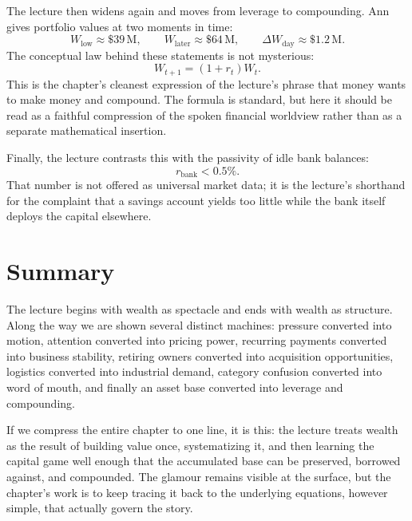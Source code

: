 The lecture then widens again and moves from leverage to compounding. Ann gives portfolio values at two moments in time:
\begin{equation}
W_{\mathrm{low}} \approx \$39\,\mathrm{M},
\qquad
W_{\mathrm{later}} \approx \$64\,\mathrm{M},
\qquad
\Delta W_{\mathrm{day}} \approx \$1.2\,\mathrm{M}.
\end{equation}
The conceptual law behind these statements is not mysterious:
\begin{equation}
W_{t+1} = (1+r_t)W_t.
\end{equation}
This is the chapter's cleanest expression of the lecture's phrase that money wants to make money and compound. The formula is standard, but here it should be read as a faithful compression of the spoken financial worldview rather than as a separate mathematical insertion.

Finally, the lecture contrasts this with the passivity of idle bank balances:
\begin{equation}
r_{\mathrm{bank}} < 0.5\%.
\end{equation}
That number is not offered as universal market data; it is the lecture's shorthand for the complaint that a savings account yields too little while the bank itself deploys the capital elsewhere.

\section{Summary}

The lecture begins with wealth as spectacle and ends with wealth as structure. Along the way we are shown several distinct machines: pressure converted into motion, attention converted into pricing power, recurring payments converted into business stability, retiring owners converted into acquisition opportunities, logistics converted into industrial demand, category confusion converted into word of mouth, and finally an asset base converted into leverage and compounding.

If we compress the entire chapter to one line, it is this: the lecture treats wealth as the result of building value once, systematizing it, and then learning the capital game well enough that the accumulated base can be preserved, borrowed against, and compounded. The glamour remains visible at the surface, but the chapter's work is to keep tracing it back to the underlying equations, however simple, that actually govern the story.